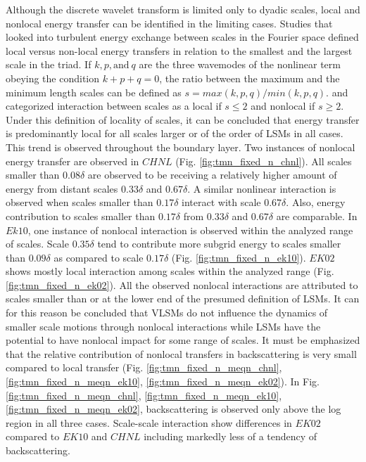 Although the discrete wavelet transform is limited only to dyadic scales, local and nonlocal energy transfer can be identified in the limiting cases. Studies that looked into turbulent energy exchange between scales in the Fourier space defined local versus non-local energy transfers in relation to the smallest and the largest scale in the triad. If $k,p, \text{and}\ q$ are the three wavemodes of the nonlinear term obeying the condition $k+p+q=0$, the ratio between the maximum and the minimum length scales can be defined as $s=max(k,p,q)/min(k,p,q)$. \citet{domaradzki_pof_1994} and \citet{bourouiba_straub_jfm11} categorized interaction between scales as a local if $s\leq 2$ and nonlocal if $s\geq 2$. Under this definition of locality of scales, it can be concluded that energy transfer is predominantly local for all scales larger or of the order of LSMs in all cases. This trend is observed throughout the boundary layer. Two instances of nonlocal energy transfer are observed in $CHNL$ (Fig. \ref{fig:tmn_fixed_n_chnl}). All scales smaller than $0.08\delta$ are observed to be receiving a relatively higher amount of energy from distant scales $0.33\delta$ and $0.67\delta$. A similar nonlinear interaction is observed when scales smaller than $0.17\delta$ interact with scale $0.67\delta$. Also, energy contribution to scales smaller than $0.17\delta$ from $0.33\delta$ and $0.67\delta$ are comparable. In  $Ek10$, one instance of nonlocal interaction is observed within the analyzed range of scales. Scale $0.35\delta$ tend to contribute more subgrid energy to scales smaller than $0.09\delta$ as compared to scale $0.17\delta$ (Fig. \ref{fig:tmn_fixed_n_ek10}). $EK02$ shows mostly local interaction among scales within the analyzed range (Fig. \ref{fig:tmn_fixed_n_ek02}). All the observed nonlocal interactions are attributed to scales smaller than or at the lower end of the presumed definition of LSMs. It can for this reason be concluded that VLSMs do not influence the dynamics of smaller scale motions through nonlocal interactions while LSMs have the potential to have nonlocal impact for some range of scales. It must be emphasized that the relative contribution of nonlocal transfers in backscattering is very small compared to local transfer (Fig. \ref{fig:tmn_fixed_n_meqn_chnl}, \ref{fig:tmn_fixed_n_meqn_ek10}, \ref{fig:tmn_fixed_n_meqn_ek02}). In Fig. \ref{fig:tmn_fixed_n_meqn_chnl}, \ref{fig:tmn_fixed_n_meqn_ek10}, \ref{fig:tmn_fixed_n_meqn_ek02}, backscattering is observed only above the log region in all three cases. Scale-scale interaction show differences in $EK02$ compared to $EK10$ and $CHNL$ including markedly less of a tendency of backscattering. 

